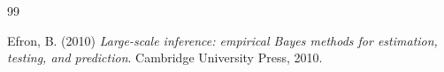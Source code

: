 \documentclass{scrartcl}
\begin{document}
\begin{thebibliography}{99}

  

Efron, B. (2010)
\textit{Large-scale inference: empirical Bayes methods for estimation,
testing, and prediction}. Cambridge University Press, 2010.
  







\end{thebibliography}
\end{document}
